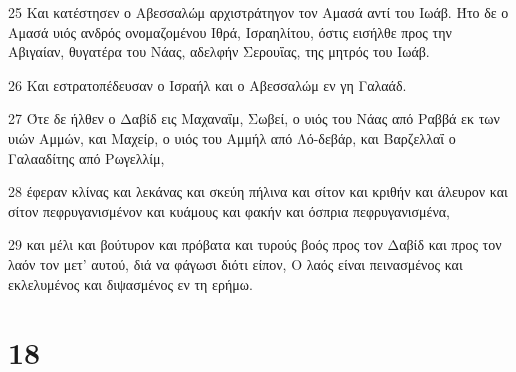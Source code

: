 \par 25 Και κατέστησεν ο Αβεσσαλώμ αρχιστράτηγον τον Αμασά αντί του Ιωάβ. Ήτο δε ο Αμασά υιός ανδρός ονομαζομένου Ιθρά, Ισραηλίτου, όστις εισήλθε προς την Αβιγαίαν, θυγατέρα του Νάας, αδελφήν Σερουΐας, της μητρός του Ιωάβ.
\par 26 Και εστρατοπέδευσαν ο Ισραήλ και ο Αβεσσαλώμ εν γη Γαλαάδ.
\par 27 Ότε δε ήλθεν ο Δαβίδ εις Μαχαναΐμ, Σωβεί, ο υιός του Νάας από Ραββά εκ των υιών Αμμών, και Μαχείρ, ο υιός του Αμμήλ από Λό-δεβάρ, και Βαρζελλαΐ ο Γαλααδίτης από Ρωγελλίμ,
\par 28 έφεραν κλίνας και λεκάνας και σκεύη πήλινα και σίτον και κριθήν και άλευρον και σίτον πεφρυγανισμένον και κυάμους και φακήν και όσπρια πεφρυγανισμένα,
\par 29 και μέλι και βούτυρον και πρόβατα και τυρούς βοός προς τον Δαβίδ και προς τον λαόν τον μετ' αυτού, διά να φάγωσι διότι είπον, Ο λαός είναι πεινασμένος και εκλελυμένος και διψασμένος εν τη ερήμω.

\chapter{18}


